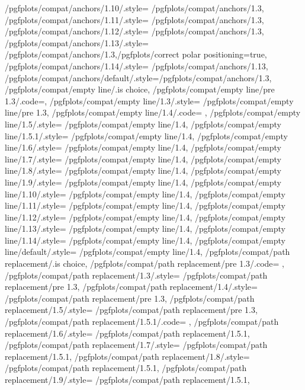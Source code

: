 {	/pgfplots/compat/anchors/1.10/.style= 	{/pgfplots/compat/anchors/1.3},%
	/pgfplots/compat/anchors/1.11/.style= 	{/pgfplots/compat/anchors/1.3},%
	/pgfplots/compat/anchors/1.12/.style= 	{/pgfplots/compat/anchors/1.3},%
	/pgfplots/compat/anchors/1.13/.style= 	{/pgfplots/compat/anchors/1.3,/pgfplots/correct polar positioning=true},%
	/pgfplots/compat/anchors/1.14/.style= 	{/pgfplots/compat/anchors/1.13},%
	/pgfplots/compat/anchors/default/.style={/pgfplots/compat/anchors/1.3},%
	/pgfplots/compat/empty line/.is choice,
	/pgfplots/compat/empty line/pre 1.3/.code={\pgfplots@emptyline@compattrue},%
	/pgfplots/compat/empty line/1.3/.style= {/pgfplots/compat/empty line/pre 1.3},%
	/pgfplots/compat/empty line/1.4/.code= 	{\pgfplots@emptyline@compatfalse},%
	/pgfplots/compat/empty line/1.5/.style= 	{/pgfplots/compat/empty line/1.4},%
	/pgfplots/compat/empty line/1.5.1/.style= 	{/pgfplots/compat/empty line/1.4},%
	/pgfplots/compat/empty line/1.6/.style= 	{/pgfplots/compat/empty line/1.4},%
	/pgfplots/compat/empty line/1.7/.style= 	{/pgfplots/compat/empty line/1.4},%
	/pgfplots/compat/empty line/1.8/.style= 	{/pgfplots/compat/empty line/1.4},%
	/pgfplots/compat/empty line/1.9/.style= 	{/pgfplots/compat/empty line/1.4},%
	/pgfplots/compat/empty line/1.10/.style= 	{/pgfplots/compat/empty line/1.4},%
	/pgfplots/compat/empty line/1.11/.style= 	{/pgfplots/compat/empty line/1.4},%
	/pgfplots/compat/empty line/1.12/.style= 	{/pgfplots/compat/empty line/1.4},%
	/pgfplots/compat/empty line/1.13/.style= 	{/pgfplots/compat/empty line/1.4},%
	/pgfplots/compat/empty line/1.14/.style= 	{/pgfplots/compat/empty line/1.4},%
	/pgfplots/compat/empty line/default/.style=	{/pgfplots/compat/empty line/1.4},%
	/pgfplots/compat/path replacement/.is choice,
	/pgfplots/compat/path replacement/pre 1.3/.code= {\pgfplots@path@replace@ellipsefalse},
	/pgfplots/compat/path replacement/1.3/.style=    {/pgfplots/compat/path replacement/pre 1.3},%
	/pgfplots/compat/path replacement/1.4/.style=  	 {/pgfplots/compat/path replacement/pre 1.3},
	/pgfplots/compat/path replacement/1.5/.style=    {/pgfplots/compat/path replacement/pre 1.3},%
	/pgfplots/compat/path replacement/1.5.1/.code=   {\pgfplots@path@replace@ellipsetrue},%
	/pgfplots/compat/path replacement/1.6/.style=   	{/pgfplots/compat/path replacement/1.5.1},
	/pgfplots/compat/path replacement/1.7/.style=   	{/pgfplots/compat/path replacement/1.5.1},
	/pgfplots/compat/path replacement/1.8/.style=   	{/pgfplots/compat/path replacement/1.5.1},
	/pgfplots/compat/path replacement/1.9/.style=   	{/pgfplots/compat/path replacement/1.5.1},
}
